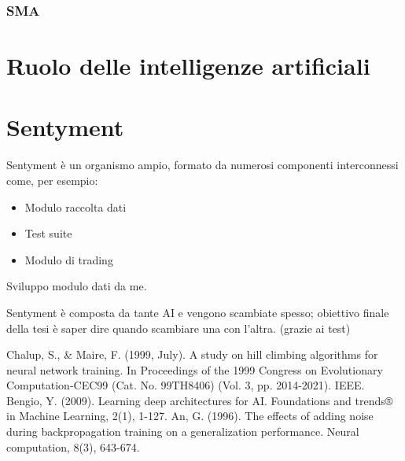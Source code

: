 \documentclass{article}
\numberwithin{equation}{section}
\begin{document}
		\subsubsection{SMA}
		
		
		
	\newpage
	\section{Ruolo delle intelligenze artificiali}		
	
	
	\newpage
	\section{Sentyment}
		Sentyment è un organismo ampio, formato da numerosi componenti interconnessi come, per esempio:
		\begin{itemize}
			\item Modulo raccolta dati
			\item Test suite
			\item Modulo di trading
		\end{itemize}
	
	
		Sviluppo modulo dati da me.
		
		Sentyment è composta da tante AI e vengono scambiate spesso; obiettivo finale della tesi è saper dire quando scambiare una con l'altra. (grazie ai test)
	    
		
		
	    \newpage
		\cite{es}
	
		\begin{thebibliography}{9}
			Chalup, S., \& Maire, F. (1999, July). A study on hill climbing algorithms for neural network training. In Proceedings of the 1999 Congress on Evolutionary Computation-CEC99 (Cat. No. 99TH8406) (Vol. 3, pp. 2014-2021). IEEE.
			\bibitem{}
			Bengio, Y. (2009). Learning deep architectures for AI. Foundations and trends® in Machine Learning, 2(1), 1-127.
			\bibitem{}
			An, G. (1996). The effects of adding noise during backpropagation training on a generalization performance. Neural computation, 8(3), 643-674.
		\end{thebibliography}
	
		\printindex
\end{document}
